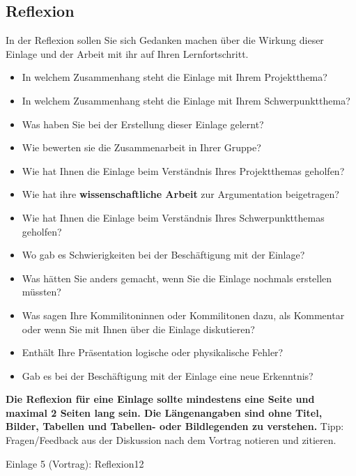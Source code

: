 \subsection{Reflexion}
\begin{hinweise}
In der Reflexion sollen Sie sich Gedanken machen über die Wirkung dieser Einlage und der Arbeit mit ihr auf
Ihren Lernfortschritt.
\begin{itemize}\itemsep0pt
\item In welchem Zusammenhang steht die Einlage mit Ihrem Projektthema?
\item In welchem Zusammenhang steht die Einlage mit Ihrem Schwerpunktthema?
\item Was haben Sie bei der Erstellung dieser Einlage gelernt?
\item Wie bewerten sie die Zusammenarbeit in Ihrer Gruppe?
\item Wie hat Ihnen die Einlage beim Verständnis Ihres Projektthemas geholfen?
\item Wie hat ihre \textbf{wissenschaftliche Arbeit} zur Argumentation beigetragen?
\item Wie hat Ihnen die Einlage beim Verständnis Ihres Schwerpunktthemas geholfen?
\item Wo gab es Schwierigkeiten bei der Beschäftigung mit der Einlage?
\item Was hätten Sie anders gemacht, wenn Sie die Einlage nochmals erstellen müssten?
\item Was sagen Ihre Kommilitoninnen oder Kommilitonen dazu, als Kommentar oder wenn Sie mit Ihnen über die Einlage diskutieren?
\item Enthält Ihre Präsentation logische oder physikalische Fehler?
\item Gab es bei der Beschäftigung mit der Einlage eine neue Erkenntnis?
\end{itemize}
\textbf{Die Reflexion für eine Einlage sollte mindestens eine Seite und maximal 2 Seiten lang sein. Die
Längenangaben sind ohne Titel, Bilder, Tabellen und Tabellen- oder Bildlegenden zu verstehen.}
Tipp: Fragen/Feedback aus der Diskussion nach dem Vortrag notieren und zitieren.
\end{hinweise}
\begin{umfang}{Einlage 5 (Vortrag): Reflexion}{1}{2}
\end{umfang}

